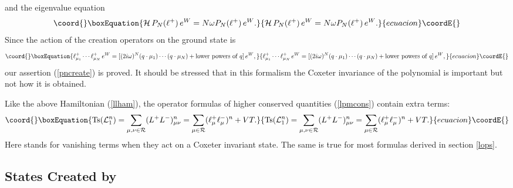 \documentclass[a4paper,12pt]{article}
\begin{document}
and the eigenvalue equation
\begin{equation}\coord{}\boxEquation{
   {\cal H}\,P_N(\ell^+)\,e^W=N\omega P_N(\ell^+)\,e^W.
}{
   {\cal H}\,P_N(\ell^+)\,e^W=N\omega P_N(\ell^+)\,e^W.
}{ecuacion}\coordE{}\end{equation}
Since the action of the creation operators on the ground state is
\begin{equation}\coord{}\boxEquation{
   \ell_{\mu_1}^+\cdots\ell_{\mu_N}^+\,e^W=[
   (2i\omega)^N(q\cdot\mu_1)\cdots(q\cdot\mu_N)
   +\mbox{lower powers of } q]\,e^W,
}{
   \ell_{\mu_1}^+\cdots\ell_{\mu_N}^+\,e^W=[
   (2i\omega)^N(q\cdot\mu_1)\cdots(q\cdot\mu_N)
   +\mbox{lower powers of } q]\,e^W,
}{ecuacion}\coordE{}\end{equation}
our assertion (\ref{pncreate}) is proved.
It should be stressed that in this formalism the Coxeter invariance of the
polynomial \coordHE{} is important but not how it is obtained.



Like the above Hamiltonian (\ref{llham}),  the \myHighlight{\(\ell\)}\coordHE{} operator formulas
of higher conserved quantities (\ref{lpmcons}) contain extra terms:
\begin{equation}\coord{}\boxEquation{
   \mbox{Ts}({\cal L}_1^n)=\sum_{\mu,\nu\in{\cal
   R}}(L^+L^-)^n_{\mu\nu}=
   \sum_{\mu\in{\cal R}}(\ell_{\mu}^+\ell_{\mu}^-)^n+ VT.
}{
   \mbox{Ts}({\cal L}_1^n)=\sum_{\mu,\nu\in{\cal
   R}}(L^+L^-)^n_{\mu\nu}=
   \sum_{\mu\in{\cal R}}(\ell_{\mu}^+\ell_{\mu}^-)^n+ VT.
}{ecuacion}\coordE{}\end{equation}
Here \coordHE{} stands for vanishing terms when they act on a Coxeter invariant
state. The same is true for most formulas derived in section
\ref{lops}.


\subsection{States Created by \coordHE{}}
\label{B2plus}
\end{document}
